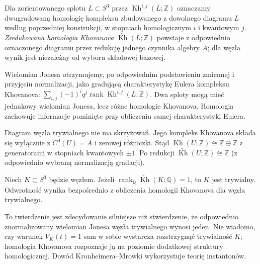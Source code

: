 \begin{definicja}
Dla zorientowanego splotu $L\subset S^3$ przez
$\operatorname{Kh}^{i,j}(L;\mathbb Z)$ oznaczamy dwugradowaną
homologię kompleksu zbudowanego z dowolnego diagramu $L$
według poprzedniej konstrukcji, w stopniach homologicznym $i$
i kwantowym $j$. \emph{Zredukowana homologia Khovanova}
$\widetilde{\operatorname{Kh}}(L;\mathbb Z)$ powstaje
z odpowiednio oznaczonego diagramu przez redukcję
jednego czynnika algebry $A$; dla węzła wynik jest
niezależny od wyboru składowej bazowej.
\end{definicja}

\begin{uwaga}[Kategoryfikacja]
Wielomian Jonesa otrzymujemy, po odpowiednim podstawieniu
zmiennej i przyjęciu normalizacji, jako gradującą
charakterystykę Eulera kompleksu Khovanova:
$\sum_{i,j}(-1)^i q^j\operatorname{rank}
\operatorname{Kh}^{i,j}(L;\mathbb Z)$.
Dwa sploty mogą mieć jednakowy wielomian Jonesa, lecz
różne homologie Khovanova. Homologia zachowuje informacje
pominięte przy obliczeniu samej charakterystyki Eulera.
\end{uwaga}

\begin{przyklad}
Diagram węzła trywialnego nie ma skrzyżowań.
Jego kompleks Khovanova składa się wyłącznie z
$C^0(U)=A$ i zerowej różniczki. Stąd
$\operatorname{Kh}(U;\mathbb Z)\cong\mathbb Z\oplus\mathbb Z$
z generatorami w stopniach kwantowych $\pm1$.
Po redukcji $\widetilde{\operatorname{Kh}}(U;\mathbb Z)
\cong\mathbb Z$ (z odpowiednio wybraną normalizacją gradacji).
\end{przyklad}

\begin{twierdzenie}
Niech $K\subset S^3$ będzie węzłem. Jeżeli
$\operatorname{rank}_{\mathbb Q}
\widetilde{\operatorname{Kh}}(K;\mathbb Q)=1$,
to $K$ jest trywialny. Odwrotność wynika bezpośrednio
z obliczenia homologii Khovanova dla węzła trywialnego.
\end{twierdzenie}

\begin{uwaga}
To twierdzenie jest zdecydowanie silniejsze niż
stwierdzenie, że odpowiednio znormalizowany wielomian
Jonesa węzła trywialnego wynosi jeden. Nie wiadomo,
czy warunek $V_K(t)=1$ sam w sobie wystarcza
rozstrzygnąć trywialność $K$; homologia Khovanova
rozpoznaje ją na poziomie dodatkowej struktury homologicznej.
Dowód Kronheimera--Mrowki wykorzystuje teorię instantonów.
\end{uwaga}

